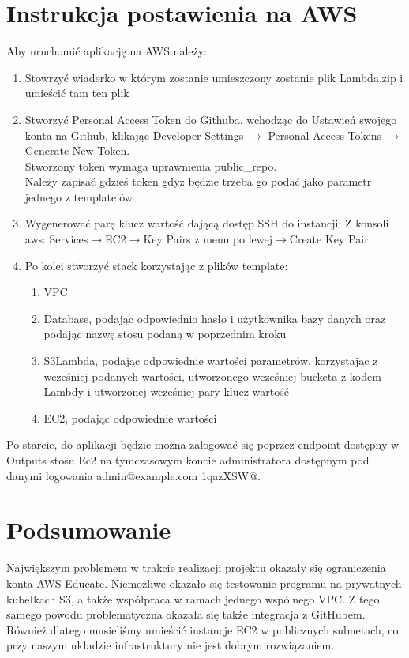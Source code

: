 \documentclass[12pt,a4paper]{article}
\begin{document}
    \section{Instrukcja postawienia na AWS}
        Aby uruchomić aplikację na AWS należy:
	\begin{enumerate}
          \item Stowrzyć wiaderko w którym zostanie umieszczony zostanie plik Lambda.zip i umieścić tam ten plik
	  \item Stworzyć Personal Access Token do Githuba, wchodząc do Ustawień swojego konta na Github, klikając Developer Settings $\rightarrow$ Personal Access Tokens $\rightarrow$ Generate New Token.
	  \\Stworzony token wymaga uprawnienia public\_repo.
          \\Należy zapisać gdzieś token gdyż będzie trzeba go podać jako parametr jednego z template'ów
          \item Wygenerować parę klucz wartość dającą dostęp SSH do instancji: Z konsoli aws: Services$\rightarrow$EC2$\rightarrow$Key Pairs z menu po lewej$\rightarrow$Create Key Pair
	  \item Po kolei stworzyć stack korzystając z plików template:
          \begin{enumerate}
            \item VPC
            \item Database, podając odpowiednio hasło i użytkownika bazy danych oraz podając nazwę stosu podaną w poprzednim kroku
            \item S3Lambda, podając odpowiednie wartości parametrów, korzystając z wcześniej podanych wartości, utworzonego wcześniej bucketa z kodem Lambdy i utworzonej wcześniej pary klucz wartość
            \item EC2, podając odpowiednie wartości
          \end{enumerate}
       \end{enumerate}
        Po starcie, do aplikacji będzie można zalogować się poprzez endpoint dostępny w Outputs stosu Ec2 na tymczasowym koncie administratora dostępnym pod danymi logowania admin@example.com 1qazXSW@.
    \section{Podsumowanie}
        Największym problemem w trakcie realizacji projektu okazały się ograniczenia konta AWS Educate.
        Niemożliwe okazało się testowanie programu na prywatnych kubełkach S3, a także współpraca w ramach jednego wspólnego VPC.
        Z tego samego powodu problematyczna okazała się także integracja z GitHubem.
        Również dlatego musieliśmy umieścić instancje EC2 w publicznych subnetach, co przy naszym układzie infrastruktury nie jest dobrym rozwiązaniem.
\end{document}
